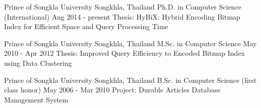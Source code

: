 
\begin{cventries}
	\cveducation
	{Prince of Songkla University}%
	{Songkhla, Thailand}%
	{Ph.D. in}%
	{Computer Science (International)}%
	{Aug 2014 - present}%
	{Thesis: HyBiX: Hybrid Encoding Bitmap Index for Efficient Space and Query Processing Time}%
	
	\cveducation
	{Prince of Songkla University}%
	{Songkhla, Thailand}%
	{M.Sc. in}%
	{Computer Science}%
	{May 2010 - Apr 2012}%
	{Thesis: Improved Query Efficiency to Encoded Bitmap Index using Data Clustering}%
	
	\cveducation
	{Prince of Songkla University}%
	{Songkhla, Thailand}%
	{B.Sc. in }%
	{Computer Science (first class honor)}%
	{May 2006 - Mar 2010}%
	{Project: Durable Articles Database Management System}%
\end{cventries}